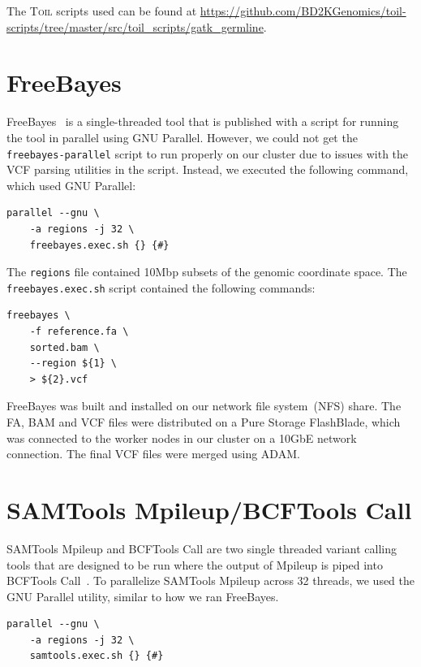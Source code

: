 \documentclass[phd]{ucbthesis}
\begin{document}
The \textsc{Toil} scripts used can be found at
\url{https://github.com/BD2KGenomics/toil-scripts/tree/master/src/toil_scripts/gatk_germline}.

\section{FreeBayes}
\label{sec:freebayes}

FreeBayes~\cite{garrison12} is a single-threaded tool that is published with a
script for running the tool in parallel using GNU Parallel. However, we could
not get the \texttt{freebayes-parallel} script to run properly on our cluster
due to issues with the VCF parsing utilities in the script. Instead, we executed
the following command, which used GNU Parallel:

\begin{lstlisting}[caption=FreeBayes Parallel Script]
parallel --gnu \
    -a regions -j 32 \
    freebayes.exec.sh {} {#}
\end{lstlisting}

The \texttt{regions} file contained 10Mbp subsets of the genomic coordinate
space. The \linebreak \texttt{freebayes.exec.sh} script contained the following
commands:

\begin{lstlisting}[caption=FreeBayes Executor Script]
freebayes \
    -f reference.fa \
    sorted.bam \
    --region ${1} \
    > ${2}.vcf
\end{lstlisting}

FreeBayes was built and installed on our network file system~(NFS) share. The
FA, BAM and VCF files were distributed on a Pure Storage FlashBlade, which was
connected to the worker nodes in our cluster on a 10GbE network connection. The
final VCF files were merged using ADAM.

\section{SAMTools Mpileup/BCFTools Call}
\label{sec:mpileup}

SAMTools Mpileup and BCFTools Call are two single threaded variant calling
tools that are designed to be run where the output of Mpileup is piped into
BCFTools Call~\cite{li11}. To parallelize SAMTools Mpileup across 32 threads,
we used the GNU Parallel utility, similar to how we ran FreeBayes.

\begin{lstlisting}[caption=Samtools Parallel Script]
parallel --gnu \
    -a regions -j 32 \
    samtools.exec.sh {} {#}
\end{lstlisting}
\end{document}

